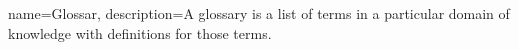 
{
    name=Glossar,
    description={A glossary is a list of terms in a particular domain of knowledge with definitions for those terms.}
}